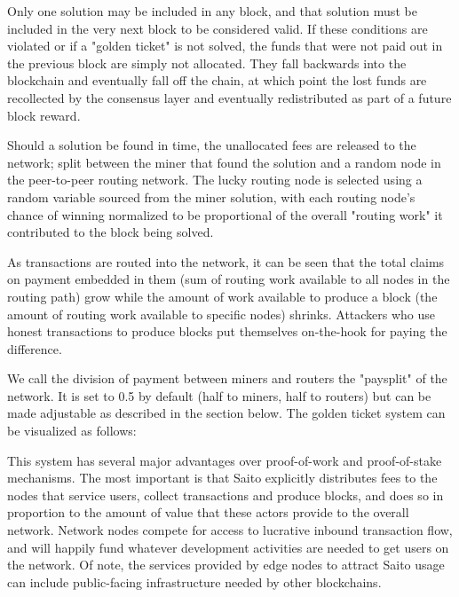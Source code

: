 \documentclass[11pt, oneside]{article}   	%
\begin{document}
\begin{multicols}{2}
Only one solution may be included in any block, and that solution must be included in the very next block to be considered valid. If these conditions are violated or if a "golden ticket" is not solved, the funds that were not paid out in the previous block are simply not allocated. They fall backwards into the blockchain and eventually fall off the chain, at which point the lost funds are recollected by the consensus layer and eventually redistributed as part of a future block reward. 

Should a solution be found in time, the unallocated fees are released to the network; split between the miner that found the solution and a random node in the peer-to-peer routing network. The lucky routing node is selected using a random variable sourced from the miner solution, with each routing node's chance of winning normalized to be proportional of the overall "routing work" it contributed to the block being solved.

As transactions are routed into the network, it can be seen that the total claims on payment embedded in them (sum of routing work available to all nodes in the routing path) grow while the amount of work available to produce a block (the amount of routing work available to specific nodes) shrinks. Attackers who use honest transactions to produce blocks put themselves on-the-hook for paying the difference.

We call the division of payment between miners and routers the "paysplit" of the network. It is set to 0.5 by default (half to miners, half to routers) but can be made adjustable as described in the section below. The golden ticket system can be visualized as follows:


This system has several major advantages over proof-of-work and proof-of-stake mechanisms. The most important is that Saito explicitly distributes fees to the nodes that service users, collect transactions and produce blocks, and does so in proportion to the amount of value that these actors provide to the overall network. Network nodes compete for access to lucrative inbound transaction flow, and will happily fund whatever development activities are needed to get users on the network. Of note, the services provided by edge nodes to attract Saito usage can include public-facing infrastructure needed by other blockchains.


\end{multicols}
\end{document}
